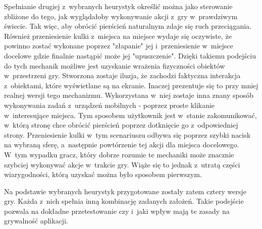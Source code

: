 \documentclass[a4paper,12pt,numbers=noenddot]{report}
\begin{document}
Spełnianie drugiej z~wybranych heurystyk określić można jako sterowanie zbliżone do tego, jak wyglądałoby wykonywanie akcji z~gry w~prawdziwym świecie. Tak więc, aby obrócić pierścień naturalnym zdaje się ruch przeciągania. Również przeniesienie kulki z~miejsca na miejsce wydaje się oczywiste, że powinno zostać wykonane poprzez "złapanie" jej i~przeniesienie w~miejsce docelowe gdzie finalnie nastąpić może jej "upuszczenie". Dzięki takiemu podejściu do tych mechanik możliwe jest uzyskanie wrażenia fizyczności obiektów w~przestrzeni gry. Stworzona zostaje iluzja, że zachodzi faktyczna interakcja z~obiektami, które wyświetlane są na ekranie. Inaczej prezentuje się to przy mniej realnej wersji tego mechanizmu. Wykorzystana w~niej zostaje inna znany sposób wykonywania zadań z~urządzeń mobilnych - poprzez proste klikanie w~interesujące miejsca. Tym sposobem użytkownik jest w~stanie zakomunikować, w~którą stronę chce obrócić pierścień poprzez dotknięcie go z~odpowiedniej strony. Przeniesienie kulki w~tym scenariuszu odbywa się poprzez szybki nacisk na wybraną sferę, a~następnie powtórzenie tej akcji dla miejsca docelowego. W~tym wypadku gracz, który dobrze rozumie te mechaniki może znacznie szybciej wykonywać akcje w~trakcie gry. Wiąże się to jednak z~utratą części wiarygodności, którą uzyskać można było sposobem pierwszym.

Na podstawie wybranych heurystyk przygotowane zostały zatem cztery wersje gry. Każda z~nich spełnia inną kombinację zadanych założeń. Takie podejście pozwala na dokładne przetestowanie czy i~jaki wpływ mają te zasady na grywalność aplikacji. 
\end{document}
